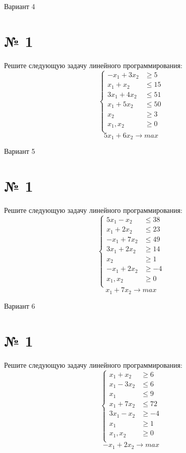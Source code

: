\documentclass{article}%
\begin{document}
%
\newpage%
\begin{center}%
\begin{Huge}%
Вариант 4%
\end{Huge}%
\end{center}%
\section*{№ 1}%
\label{sec:1}%
Решите следующую задачу линейного программирования: %
\[%
\left\{\begin{aligned}-x_{1}+3x_{2} & \ge5 \\x_{1}+x_{2} & \le15 \\3x_{1}+4x_{2} & \le51 \\x_{1}+5x_{2} & \le50 \\x_{2} & \ge3 \\x_{1},x_{2} & \ge 0 \\\end{aligned}\right.%
\]%
\[%
5x_{1}+6x_{2}  \to max%
\]

%
\newpage%
\begin{center}%
\begin{Huge}%
Вариант 5%
\end{Huge}%
\end{center}%
\section*{№ 1}%
\label{sec:1}%
Решите следующую задачу линейного программирования: %
\[%
\left\{\begin{aligned}5x_{1}-x_{2} & \le38 \\x_{1}+2x_{2} & \le23 \\-x_{1}+7x_{2} & \le49 \\3x_{1}+2x_{2} & \ge14 \\x_{2} & \ge1 \\-x_{1}+2x_{2} & \ge-4 \\x_{1},x_{2} & \ge 0 \\\end{aligned}\right.%
\]%
\[%
x_{1}+7x_{2}  \to max%
\]

%
\newpage%
\begin{center}%
\begin{Huge}%
Вариант 6%
\end{Huge}%
\end{center}%
\section*{№ 1}%
\label{sec:1}%
Решите следующую задачу линейного программирования: %
\[%
\left\{\begin{aligned}x_{1}+x_{2} & \ge6 \\x_{1}-3x_{2} & \le6 \\x_{1} & \le9 \\x_{1}+7x_{2} & \le72 \\3x_{1}-x_{2} & \ge-4 \\x_{1} & \ge1 \\x_{1},x_{2} & \ge 0 \\\end{aligned}\right.%
\]%
\[%
-x_{1}+2x_{2}  \to max%
\]
\end{document}
